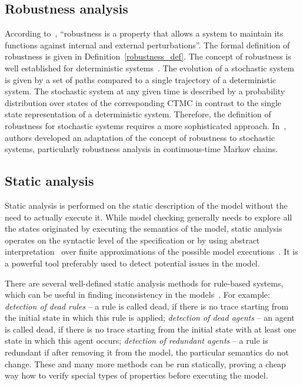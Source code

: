 \documentclass[11pt,a4paper]{report}
\begin{document}
\subsection{Robustness analysis}

According to~\cite{kitano2004biological}, ``robustness is a property that allows a system to maintain its functions against internal and external perturbations''. The formal definition of robustness is given in Definition~\ref{robustness_def}. The concept of robustness is well established for deterministic systems~\cite{donze2011robustness,rizk2009general}. The evolution of a stochastic system is given
by a set of paths compared to a single trajectory of a deterministic system. The stochastic system at any given time is described by a probability distribution over states of the corresponding CTMC in contrast to the single state representation of a deterministic system. Therefore, the definition of robustness for stochastic systems requires a more sophisticated approach. In~\cite{vceska2014robustness}, authors developed an adaptation of the concept of robustness to stochastic systems, particularly robustness analysis in continuous-time Markov chains.

\subsection{Static analysis}\label{static_analysis}

Static analysis is performed on the static description of the model without the need to actually execute it. While model checking generally needs to explore all the states originated by executing the semantics of the model, static analysis operates on the syntactic level of the specification or by using abstract interpretation~\cite{cousot1977abstract} over finite approximations of the possible model executions~\cite{pauleve2012static}. It is a powerful tool preferably used to detect potential issues in the model.

There are several well-defined static analysis methods for rule-based systems, which can be useful in finding inconsistency in the models~\cite{danos2009rule}. For example: \emph{detection of dead rules} -- a rule is called dead, if there is no trace starting from the initial state in which this rule is applied; \emph{detection of dead agents} -- an agent is called dead, if there is no trace starting from the initial state with at least one state in which this agent occurs; \emph{detection of redundant agents} -- a rule is redundant if after removing it from the model, the particular semantics do not change. These and many more methods can be run statically, proving a cheap way how to verify special types of properties before executing the model.
\end{document}

